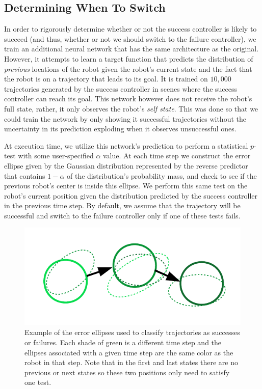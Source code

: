 \documentclass[letterpaper, 10 pt, conference]{ieeeconf}  %
\begin{document}
	\subsection{Determining When To Switch}
		In order to rigorously determine whether or not the success controller is likely to succeed (and thus, whether or not we should switch to the failure controller), we train an additional neural network that has the same architecture as the original. However, it attempts to learn a target function that predicts the distribution of \textit{previous} locations of the robot given the robot's current state and the fact that the robot is on a trajectory that leads to its goal. It is trained on $10,000$ trajectories generated by the success controller in scenes where the success controller can reach its goal. This network however does not receive the robot's full state, rather, it only observes the robot's \textit{self state}. This was done so that we could train the network by only showing it successful trajectories without the uncertainty in its prediction exploding when it observes unsuccessful ones. 
		
		At execution time, we utilize this network's prediction to perform a statistical $p$-test with some user-specified $\alpha$ value. At each time step we construct the error ellipse given by the Gaussian distribution represented by the reverse predictor that contains $1-\alpha$ of the distribution's probability mass, and check to see if the previous robot's center is inside this ellipse. We perform this same test on the robot's current position given the distribution predicted by the success controller in the previous time step. By default, we assume that the trajectory will be successful and switch to the failure controller only if one of these tests fails.
		
		\begin{figure}
			\centering
			\includegraphics[width=\linewidth]{success_ellipses}
			\caption{Example of the error ellipses used to classify trajectories as successes or failures. Each shade of green is a different time step and the ellipses associated with a given time step are the same color as the robot in that step. Note that in the first and last states there are no previous or next states so these two positions only need to satisfy one test.}
		\end{figure}
	
\end{document}
